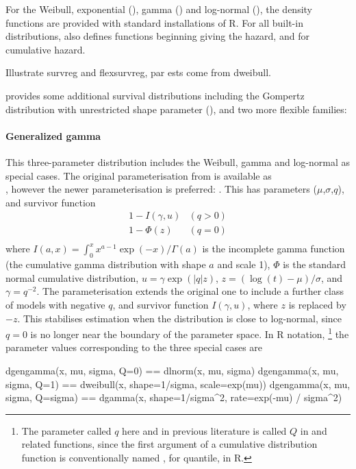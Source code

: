 \documentclass[nojss,nofooter]{jss}
\begin{document}
For the Weibull, exponential (), gamma () and
log-normal (), the density functions are provided with
standard installations of R.  For all built-in distributions,
 also defines functions beginning  giving the
hazard, and  for cumulative hazard.

Illustrate survreg and flexsurvreg, par ests come from dweibull.

 provides some additional survival distributions
including the Gompertz distribution with unrestricted shape parameter
(), and two more flexible families:

\paragraph{Generalized gamma} This three-parameter distribution
includes the Weibull, gamma and log-normal as special cases.  The
original parameterisation from \citet{stacy:gengamma} is available as\\
, however the newer parameterisation
\citep{prentice:loggamma} is preferred: .  This has
parameters ($\mu$,$\sigma$,$q$), and survivor function
\[
\begin{array}{ll}
1 - I(\gamma,u)   & (q > 0)\\
1 - \Phi(z)  & (q = 0)\\
\end{array}
\]
where $I(a,x) = \int_0^x x^{a-1}\exp(-x)/\Gamma(a)$ is the incomplete gamma function (the cumulative gamma distribution with shape $a$ and scale 1), $\Phi$ is the standard normal cumulative distribution,  $u = \gamma \exp(|q|z)$, $z=(\log(t) - \mu)/\sigma$, and $\gamma=q^{-2}$.   The \citet{prentice:loggamma} parameterisation extends the original one to include a further class of models with negative $q$, and survivor function $I(\gamma,u)$, where $z$ is replaced by $-z$.   This stabilises estimation when the distribution is close to log-normal, since $q=0$ is no longer near the boundary of the parameter space.    In R notation, \footnote{The parameter called $q$ here and in previous literature is called $Q$ in  and related functions, since the first argument of a cumulative distribution function is conventionally named , for quantile, in R.} the parameter values corresponding to the three special cases are

\begin{Code}
dgengamma(x, mu, sigma, Q=0)     ==  dlnorm(x, mu, sigma)                                
dgengamma(x, mu, sigma, Q=1)     ==  dweibull(x, shape=1/sigma, scale=exp(mu))           
dgengamma(x, mu, sigma, Q=sigma) ==  dgamma(x, shape=1/sigma^2, 
                                               rate=exp(-mu) / sigma^2)  
\end{Code}
\end{document}
